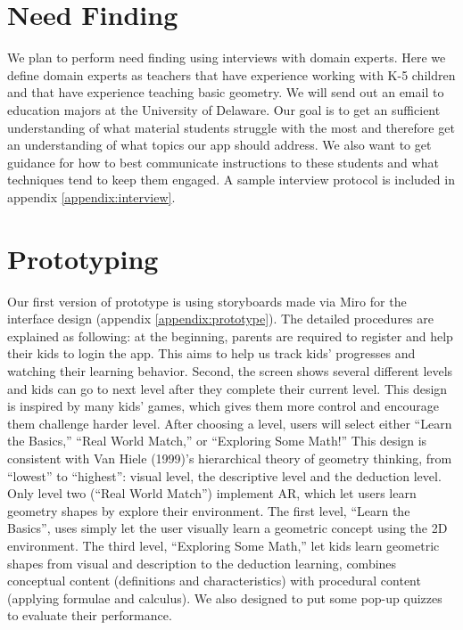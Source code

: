 \documentclass[acmsmall, nonacm]{acmart}
\begin{document}
\section{Need Finding}

We plan to perform need finding using interviews with domain experts.  Here we
define domain experts as teachers that have experience working with K-5 children
and that have experience teaching basic geometry. We will send out an email to
education majors at the University of Delaware. Our goal is to get an sufficient
understanding of what material students struggle with the most and therefore get
an understanding of what topics our app should address. We also want to get
guidance for how to best communicate instructions to these students and what
techniques tend to keep them engaged. A sample interview protocol is included in
appendix \ref{appendix:interview}.

\section{Prototyping}

Our first version of prototype is using storyboards made via Miro for the
interface design (appendix \ref{appendix:prototype}). The detailed procedures
are explained as following: at the beginning, parents are required to register
and help their kids to login the app. This aims to help us track kids’
progresses and watching their learning behavior. Second, the screen shows
several different levels and kids can go to next level after they complete their
current level. This design is inspired by many kids’ games, which gives them
more control and encourage them challenge harder level. After choosing a level,
users will select either ``Learn the Basics,'' ``Real World Match,'' or ``Exploring
Some Math!'' This design is consistent with Van Hiele (1999)’s hierarchical
theory of geometry thinking, from “lowest” to “highest”: visual level, the
descriptive level and the deduction level. Only level two (“Real World Match”)
implement AR, which let users learn geometry shapes by explore their
environment. The first level, “Learn the Basics”, uses simply let the user
visually learn a geometric concept using the 2D environment. The third level,
“Exploring Some Math,” let kids learn geometric shapes from visual and
description to the deduction learning, combines conceptual content (definitions
and characteristics) with procedural content (applying formulae and
calculus). We also designed to put some pop-up quizzes to evaluate their
performance.
\end{document}
